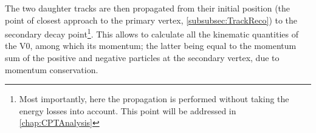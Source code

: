 
The two daughter tracks are then propagated from their initial position (the point of closest approach to the primary vertex, \Sec\ref{subsubsec:TrackReco}) to the secondary decay point\footnote{Most importantly, here the propagation is performed without taking the energy losses into account. This point will be addressed in \chap\ref{chap:CPTAnalysis}\label{footnote:EnergyLossV0CascVertexing}}. This allows to calculate all the kinematic quantities of the V0, among which its momentum; the latter being equal to the momentum sum of the positive and negative particles at the secondary vertex, due to momentum conservation.

